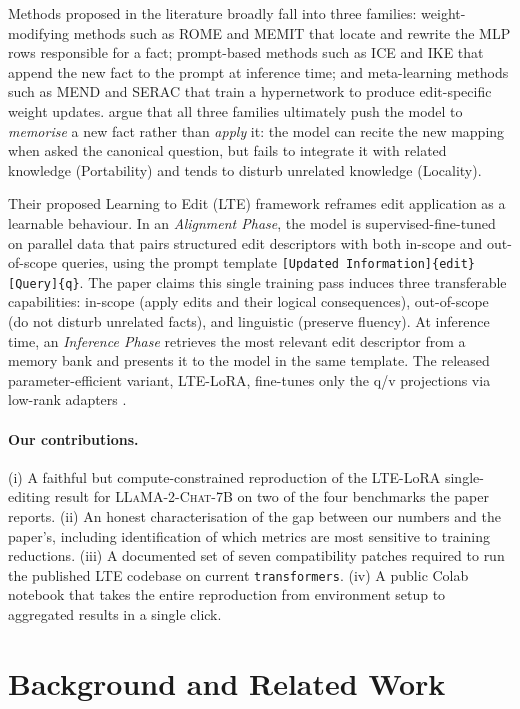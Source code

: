 \documentclass[11pt,a4paper,twocolumn]{article}
\begin{document}
Methods proposed in the literature broadly fall into three families: weight-modifying methods such as ROME and MEMIT that locate and rewrite the MLP rows responsible for a fact; prompt-based methods such as ICE and IKE that append the new fact to the prompt at inference time; and meta-learning methods such as MEND and SERAC that train a hypernetwork to produce edit-specific weight updates. \citet{jiang2024learning} argue that all three families ultimately push the model to \emph{memorise} a new fact rather than \emph{apply} it: the model can recite the new mapping when asked the canonical question, but fails to integrate it with related knowledge (Portability) and tends to disturb unrelated knowledge (Locality).

Their proposed Learning to Edit (LTE) framework reframes edit application as a learnable behaviour. In an \emph{Alignment Phase}, the model is supervised-fine-tuned on parallel data that pairs structured edit descriptors with both in-scope and out-of-scope queries, using the prompt template \texttt{[Updated Information]\{edit\} [Query]\{q\}}. The paper claims this single training pass induces three transferable capabilities: in-scope (apply edits and their logical consequences), out-of-scope (do not disturb unrelated facts), and linguistic (preserve fluency). At inference time, an \emph{Inference Phase} retrieves the most relevant edit descriptor from a memory bank and presents it to the model in the same template. The released parameter-efficient variant, LTE-LoRA, fine-tunes only the q/v projections via low-rank adapters \citep{hu2021lora}.

\paragraph{Our contributions.} (i) A faithful but compute-constrained reproduction of the LTE-LoRA single-editing result for \textsc{LLaMA-2-Chat-7B} on two of the four benchmarks the paper reports. (ii) An honest characterisation of the gap between our numbers and the paper's, including identification of which metrics are most sensitive to training reductions. (iii) A documented set of seven compatibility patches required to run the published LTE codebase on current \texttt{transformers}. (iv) A public Colab notebook that takes the entire reproduction from environment setup to aggregated results in a single click.

\section{Background and Related Work}
\label{sec:related}
\end{document}
